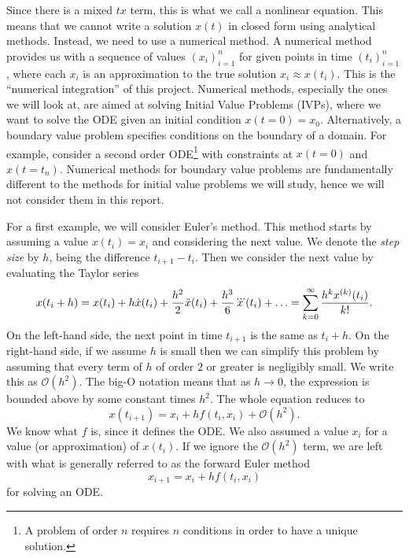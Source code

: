 \documentclass{report}
\theoremstyle{exampstyle} \newtheorem{example}[theorem]{Example}
\theoremstyle{exampstyle} \newtheorem{remark}[theorem]{Remark}
\theoremstyle{exampstyle} \newtheorem{definition}[theorem]{Definition}
\theoremstyle{exampstyle} \newtheorem{lemma}[theorem]{Lemma}
\begin{document}
Since there is a mixed $tx$ term, this is what we call a nonlinear equation.
This means that we cannot write a solution $x(t)$ in closed form using analytical methods.
Instead, we need to use a numerical method.
A numerical method provides us with a sequence of values $(x_i)_{i=1}^n$ for given points in time $(t_i)_{i=1}^n$, where each $x_i$ is an approximation to the true solution $x_i \approx x(t_i)$.
This is the ``numerical integration'' of this project.
Numerical methods, especially the ones we will look at, are aimed at solving Initial Value Problems (IVPs), where we want to solve the ODE given an initial condition $x(t=0) = x_0$.
Alternatively, a boundary value problem specifies conditions on the boundary of a domain. For example, consider a second order ODE\footnote{
    A problem of order $n$ requires $n$ conditions in order to have a unique solution.
} with constraints at $x(t=0)$ and $x(t = t_n)$.
Numerical methods for boundary value problems are fundamentally different to the methods for initial value problems we will study, hence we will not consider them in this report.

For a first example, we will consider Euler's method. This method starts by assuming a value $x(t_i) = x_i$ and considering the next value.
We denote the \textit{step size} by $h$, being the difference $t_{i+1} - t_i$.
Then we consider the next value by evaluating the Taylor series
\begin{equation*}
    x(t_i + h) = x(t_i) + h \dot{x}(t_i) + \frac{h^2}{2}\ddot{x}(t_i) + \frac{h^3}{6}\dddot{x}(t_i) + \mathellipsis = \sum_{k=0}^{\infty} \frac{h^k x^{(k)}(t_i)}{k!}.
\end{equation*}
On the left-hand side, the next point in time $t_{i+1}$ is the same as $t_i + h$.
On the right-hand side, if we assume $h$ is small then we can simplify this problem by assuming that every term of $h$ of order $2$ or greater is negligibly small.
We write this as $\mathcal{O}(h^2)$. The big-O notation means that as $h \rightarrow 0$, the expression is bounded above by some constant times $h^2$.
The whole equation reduces to
\begin{equation*}
    x(t_{i+1}) = x_i + hf(t_i, x_i) + \mathcal{O}(h^2).
\end{equation*}
We know what $f$ is, since it defines the ODE. We also assumed a value $x_i$ for a value (or approximation) of $x(t_i)$.
If we ignore the $\mathcal{O}(h^2)$ term, we are left with what is generally referred to as the forward Euler method
\begin{equation}
    x_{i+1} = x_i + h f(t_i, x_i)
\end{equation}
for solving an ODE.
\end{document}
